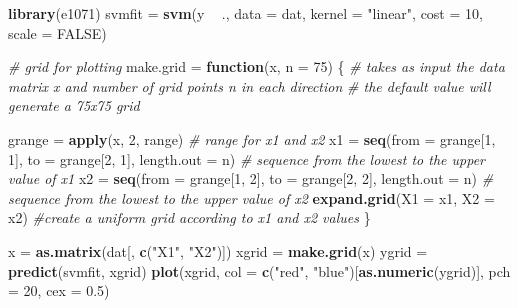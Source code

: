 \documentclass[]{article}
\newenvironment{Shaded}{\begin{snugshade}}{\end{snugshade}}
\newcommand{\CommentTok}[1]{\textcolor[rgb]{0.56,0.35,0.01}{\textit{#1}}}
\newcommand{\ControlFlowTok}[1]{\textcolor[rgb]{0.13,0.29,0.53}{\textbf{#1}}}
\newcommand{\DataTypeTok}[1]{\textcolor[rgb]{0.13,0.29,0.53}{#1}}
\newcommand{\DecValTok}[1]{\textcolor[rgb]{0.00,0.00,0.81}{#1}}
\newcommand{\FloatTok}[1]{\textcolor[rgb]{0.00,0.00,0.81}{#1}}
\newcommand{\KeywordTok}[1]{\textcolor[rgb]{0.13,0.29,0.53}{\textbf{#1}}}
\newcommand{\NormalTok}[1]{#1}
\newcommand{\OperatorTok}[1]{\textcolor[rgb]{0.81,0.36,0.00}{\textbf{#1}}}
\newcommand{\OtherTok}[1]{\textcolor[rgb]{0.56,0.35,0.01}{#1}}
\newcommand{\StringTok}[1]{\textcolor[rgb]{0.31,0.60,0.02}{#1}}
\begin{document}
\begin{Shaded}
\begin{Highlighting}[]
\KeywordTok{library}\NormalTok{(e1071)}
\NormalTok{svmfit =}\StringTok{ }\KeywordTok{svm}\NormalTok{(y }\OperatorTok{~}\StringTok{ }\NormalTok{., }\DataTypeTok{data =}\NormalTok{ dat, }\DataTypeTok{kernel =} \StringTok{"linear"}\NormalTok{, }\DataTypeTok{cost =} \DecValTok{10}\NormalTok{, }\DataTypeTok{scale =} \OtherTok{FALSE}\NormalTok{)}

\CommentTok{# grid for plotting}
\NormalTok{make.grid =}\StringTok{ }\ControlFlowTok{function}\NormalTok{(x, }\DataTypeTok{n =} \DecValTok{75}\NormalTok{) \{}
    \CommentTok{# takes as input the data matrix x and number of grid points n in each direction}
    \CommentTok{# the default value will generate a 75x75 grid}
    
\NormalTok{    grange =}\StringTok{ }\KeywordTok{apply}\NormalTok{(x, }\DecValTok{2}\NormalTok{, range)  }\CommentTok{# range for x1 and x2}
\NormalTok{    x1 =}\StringTok{ }\KeywordTok{seq}\NormalTok{(}\DataTypeTok{from =}\NormalTok{ grange[}\DecValTok{1}\NormalTok{, }\DecValTok{1}\NormalTok{], }\DataTypeTok{to =}\NormalTok{ grange[}\DecValTok{2}\NormalTok{, }\DecValTok{1}\NormalTok{], }\DataTypeTok{length.out =}\NormalTok{ n)  }\CommentTok{# sequence from the lowest to the upper value of x1}
\NormalTok{    x2 =}\StringTok{ }\KeywordTok{seq}\NormalTok{(}\DataTypeTok{from =}\NormalTok{ grange[}\DecValTok{1}\NormalTok{, }\DecValTok{2}\NormalTok{], }\DataTypeTok{to =}\NormalTok{ grange[}\DecValTok{2}\NormalTok{, }\DecValTok{2}\NormalTok{], }\DataTypeTok{length.out =}\NormalTok{ n)  }\CommentTok{# sequence from the lowest to the upper value of x2}
    \KeywordTok{expand.grid}\NormalTok{(}\DataTypeTok{X1 =}\NormalTok{ x1, }\DataTypeTok{X2 =}\NormalTok{ x2)  }\CommentTok{#create a uniform grid according to x1 and x2 values}
\NormalTok{\}}
\end{Highlighting}
\end{Shaded}

\begin{Shaded}
\begin{Highlighting}[]
\NormalTok{x =}\StringTok{ }\KeywordTok{as.matrix}\NormalTok{(dat[, }\KeywordTok{c}\NormalTok{(}\StringTok{"X1"}\NormalTok{, }\StringTok{"X2"}\NormalTok{)])}
\NormalTok{xgrid =}\StringTok{ }\KeywordTok{make.grid}\NormalTok{(x)}
\NormalTok{ygrid =}\StringTok{ }\KeywordTok{predict}\NormalTok{(svmfit, xgrid)}
\KeywordTok{plot}\NormalTok{(xgrid, }\DataTypeTok{col =} \KeywordTok{c}\NormalTok{(}\StringTok{"red"}\NormalTok{, }\StringTok{"blue"}\NormalTok{)[}\KeywordTok{as.numeric}\NormalTok{(ygrid)], }\DataTypeTok{pch =} \DecValTok{20}\NormalTok{, }\DataTypeTok{cex =} \FloatTok{0.5}\NormalTok{)}
\end{Highlighting}
\end{Shaded}
\end{document}
